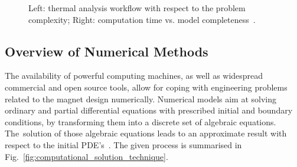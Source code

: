 \begin{figure}[H]
  \centering
  \caption{Left: thermal analysis workflow with respect to the problem complexity; Right: computation time vs. model completeness~\cite{steam_architecture_presentation}.}
  \label{fig:model_complexity_vs_completeness}
\end{figure}


\subsection{Overview of Numerical Methods}

The availability of powerful computing machines, as well as widespread commercial and open source tools, allow for coping with engineering problems related to the magnet design numerically. Numerical models aim at solving ordinary and partial differential equations with prescribed initial and boundary conditions, by transforming them into a discrete set of algebraic equations. The~solution of those algebraic equations leads to an approximate result with respect to the initial PDE's~\cite{eth_introduction_to_finite_element}. The given process is summarised in Fig.~\ref{fig:computational_solution_technique}. 

